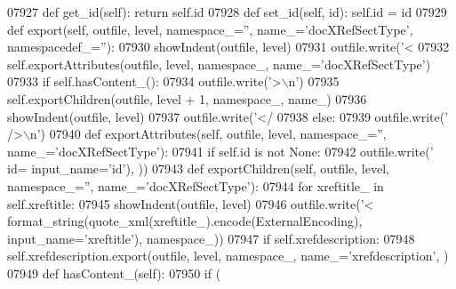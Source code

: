\begin{DoxyCode}
{{{{{{{{{{{{{{{{{{{{{{{{{{{{{{{{{{{{{{{{{{{{{{{{{{{{{{{{{{{{{{{{{{{{{{{{{{{{{{{{{{{{{{{{{{{{{{{{{{{{{{{{{{{{{{{{{{{{{{{{{{{{{{{{{{{{{{{{{{{{{{{{{{{{{{{{{{{{{{{{{{{{{{{{{{{{{{{{{{{{{{{{{{{{{{{{{{{{{{{{{{{{{{{{{{{{{{{{{{{{{{{{{{{{{{{{{{{{{{{{{{{{{{{{{{{{{{{{{{{{{{{{{{{{{{{{{{{{{{{{{{{{{{{{{{{{{{{{{{{{{{{{{{{{{{{{{{{{{{{{{{{{{{{{{{{{{{{{{{{{{{{{{{{{{{{{{{{{{{{{{{{{{{{{{{{{{{{{{{{{{{{{{{{{{{{{{{{{{{{{{{{{{{{{{{{{{{{{{{{{{{{{{{{{{{{{{{{{{{{{{{{{{{{{{{{{{{{{{{{{{{{{{{{{{{{{{{{{{{{{{{{{{{07927     \textcolor{keyword}{def }get_id(self): \textcolor{keywordflow}{return} self.id
07928     \textcolor{keyword}{def }set_id(self, id): self.id = id
07929     \textcolor{keyword}{def }export(self, outfile, level, namespace\_='', name\_='docXRefSectType', namespacedef\_=''):
07930         showIndent(outfile, level)
07931         outfile.write(\textcolor{stringliteral}{'<%
07932         self.exportAttributes(outfile, level, namespace\_, name\_=\textcolor{stringliteral}{'docXRefSectType'})
07933         \textcolor{keywordflow}{if} self.hasContent_():
07934             outfile.write(\textcolor{stringliteral}{'>\(\backslash\)n'})
07935             self.exportChildren(outfile, level + 1, namespace\_, name\_)
07936             showIndent(outfile, level)
07937             outfile.write(\textcolor{stringliteral}{'</%
07938         \textcolor{keywordflow}{else}:
07939             outfile.write(\textcolor{stringliteral}{' />\(\backslash\)n'})
07940     \textcolor{keyword}{def }exportAttributes(self, outfile, level, namespace\_='', name\_='docXRefSectType'):
07941         \textcolor{keywordflow}{if} self.id \textcolor{keywordflow}{is} \textcolor{keywordflow}{not} \textcolor{keywordtype}{None}:
07942             outfile.write(\textcolor{stringliteral}{' id=%
      input\_name=\textcolor{stringliteral}{'id'}), ))
07943     \textcolor{keyword}{def }exportChildren(self, outfile, level, namespace\_='', name\_='docXRefSectType'):
07944         \textcolor{keywordflow}{for} xreftitle\_ \textcolor{keywordflow}{in} self.xreftitle:
07945             showIndent(outfile, level)
07946             outfile.write(\textcolor{stringliteral}{'<%
      format_string(quote_xml(xreftitle\_).encode(ExternalEncoding), input\_name=\textcolor{stringliteral}{'xreftitle'}), namespace\_))
07947         \textcolor{keywordflow}{if} self.xrefdescription:
07948             self.xrefdescription.export(outfile, level, namespace\_, name\_=\textcolor{stringliteral}{'xrefdescription'}, )
07949     \textcolor{keyword}{def }hasContent_(self):
07950         \textcolor{keywordflow}{if} (
}}}}}}}}}}}}}}}}}}}}}}}}}}}}}}}}}}}}}}}}}}}}}}}}}}}}}}}}}}}}}}}}}}}}}}}}}}}}}}}}}}}}}}}}}}}}}}}}}}}}}}}}}}}}}}}}}}}}}}}}}}}}}}}}}}}}}}}}}}}}}}}}}}}}}}}}}}}}}}}}}}}}}}}}}}}}}}}}}}}}}}}}}}}}}}}}}}}}}}}}}}}}}}}}}}}}}}}}}}}}}}}}}}}}}}}}}}}}}}}}}}}}}}}}}}}}}}}}}}}}}}}}}}}}}}}}}}}}}}}}}}}}}}}}}}}}}}}}}}}}}}}}}}}}}}}}}}}}}}}}}}}}}}}}}}}}}}}}}}}}}}}}}}}}}}}}}}}}}}}}}}}}}}}}}}}}}}}}}}}}}}}}}}}}}}}}}}}}}}}}}}}}}}}}}}}}}}}}}}}}}}}}}}}}}}}}}}}}}}}}}}}}}}}}}}}}}}}}}}}}}}}}}}}}}}}}}}}}}}}}}}}}}}}}}}
\end{DoxyCode}
